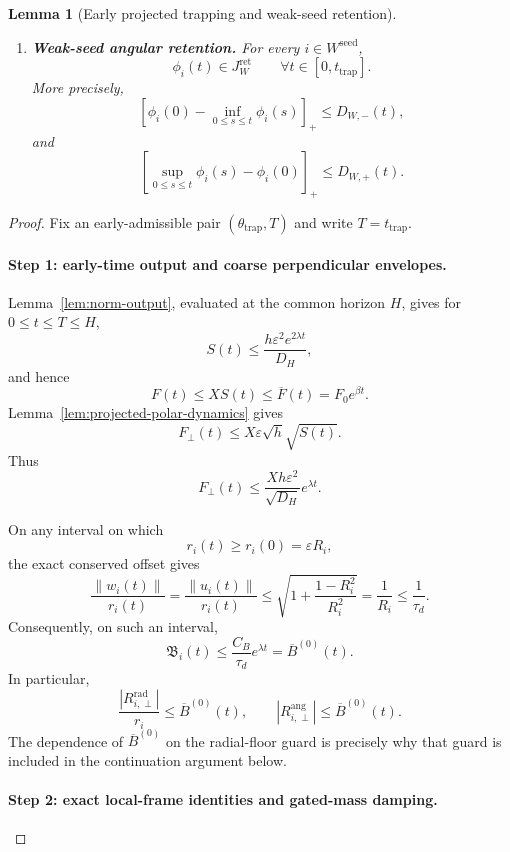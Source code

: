 \documentclass{article} %
\theoremstyle{plain}
\newtheorem{lemma}[theorem]{Lemma}
\theoremstyle{definition}
\theoremstyle{remark}
\begin{document}
\begin{lemma}[Early projected trapping and weak-seed retention]
\begin{enumerate}[label=\textnormal{(\roman*)},leftmargin=2.4em]
\item
\textbf{Weak-seed angular retention.}
For every $i\in W^{\mathrm{seed}}$,
\[
\boxed{
\phi_i(t)\in J_W^{\mathrm{ret}}
\qquad
\forall t\in[0,t_{\mathrm{trap}}].
}
\]
More precisely,
\[
\boxed{
\left[
\phi_i(0)-\inf_{0\le s\le t}\phi_i(s)
\right]_+
\le
D_{W,-}(t),
}
\]
and
\[
\boxed{
\left[
\sup_{0\le s\le t}\phi_i(s)-\phi_i(0)
\right]_+
\le
D_{W,+}(t).
}
\]

\end{enumerate}
\end{lemma}

\begin{proof}
Fix an early-admissible pair
$(\theta_{\mathrm{trap}},T)$ and write
$T=t_{\mathrm{trap}}$.

\paragraph{Step 1: early-time output and coarse perpendicular envelopes.}

Lemma~\ref{lem:norm-output}, evaluated at the common horizon $H$, gives
for $0\le t\le T\le H$,
\[
S(t)
\le
\frac{h\varepsilon^2e^{2\lambda t}}{D_H},
\]
and hence
\[
F(t)
\le
XS(t)
\le
\overline F(t)
=
F_0e^{\beta t}.
\]
Lemma~\ref{lem:projected-polar-dynamics} gives
\[
F_\perp(t)
\le
X\varepsilon\sqrt h\sqrt{S(t)}.
\]
Thus
\[
F_\perp(t)
\le
\frac{Xh\varepsilon^2}{\sqrt{D_H}}
e^{\lambda t}.
\]

On any interval on which
\[
r_i(t)\ge r_i(0)=\varepsilon R_i,
\]
the exact conserved offset gives
\[
\frac{\|w_i(t)\|}{r_i(t)}
=
\frac{\|u_i(t)\|}{r_i(t)}
\le
\sqrt{
1+
\frac{1-R_i^2}{R_i^2}
}
=
\frac1{R_i}
\le
\frac1{\tau_d}.
\]
Consequently, on such an interval,
\[
\mathfrak B_i(t)
\le
\frac{C_B}{\tau_d}e^{\lambda t}
=
\overline B^{(0)}(t).
\]
In particular,
\[
\frac{|R_{i,\perp}^{\mathrm{rad}}|}{r_i}
\le
\overline B^{(0)}(t),
\qquad
|R_{i,\perp}^{\mathrm{ang}}|
\le
\overline B^{(0)}(t).
\]
The dependence of $\overline B^{(0)}$ on the radial-floor guard is precisely
why that guard is included in the continuation argument below.

\paragraph{Step 2: exact local-frame identities and gated-mass damping.}


\end{proof}
\end{document}

